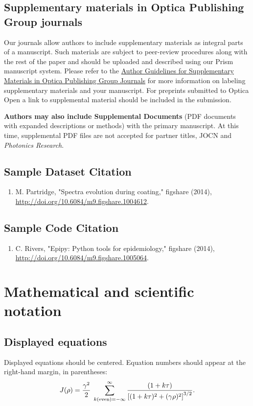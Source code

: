 \documentclass{optica-article}
\begin{document}
\subsection{Supplementary materials in Optica Publishing Group journals}
Our journals allow authors to include supplementary materials as integral parts of a manuscript. Such materials are subject to peer-review procedures along with the rest of the paper and should be uploaded and described using our Prism manuscript system. Please refer to the \href{https://opg.optica.org/submit/style/supplementary_materials.cfm}{Author Guidelines for Supplementary Materials in Optica Publishing Group Journals} for more information on labeling supplementary materials and your manuscript. For preprints submitted to Optica Open a link to supplemental material should be included in the submission.

\textbf{Authors may also include Supplemental Documents} (PDF documents with expanded descriptions or methods) with the primary manuscript. At this time, supplemental PDF files are not accepted for partner titles, JOCN and \emph{Photonics Research}. 

\subsection{Sample Dataset Citation}

\begin{enumerate}
\item M. Partridge, "Spectra evolution during coating," figshare (2014), \url{http://doi.org/10.6084/m9.figshare.1004612}.   
\end{enumerate}

\subsection{Sample Code Citation}

\begin{enumerate}
\item C. Rivers, "Epipy: Python tools for epidemiology," figshare (2014), 
\url{http://doi.org/10.6084/m9.figshare.1005064}.
\end{enumerate}

\section{Mathematical and scientific notation}

\subsection{Displayed equations} Displayed equations should be centered.
Equation numbers should appear at the right-hand margin, in
parentheses:
\begin{equation}
J(\rho) =
 \frac{\gamma^2}{2} \; \sum_{k({\rm even}) = -\infty}^{\infty}
	\frac{(1 + k \tau)}{ \left[ (1 + k \tau)^2 + (\gamma  \rho)^2  \right]^{3/2} }.
\end{equation}
\end{document}
